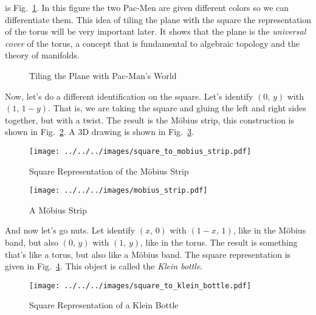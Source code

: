 \documentclass{article}
\theoremstyle{plain}
\theoremstyle{normal}
\begin{document}
        is Fig.~\ref{fig:plane_torus_pacman}. In this figure the two Pac-Men are
        given different colors so we can differentiate them. This idea of tiling
        the plane with the square the representation of the torus will be very
        important later. It shows that the plane is the
        \textit{universal cover} of the torus, a concept that is fundamental
        to algebraic topology and the theory of manifolds.
        \begin{figure}
            \centering
            \caption{Tiling the Plane with Pac-Man's World}
            \label{fig:plane_torus_pacman}
        \end{figure}
        \par\hfill\par
        Now, let's do a different identification on the square. Let's identify
        $(0,\,y)$ with $(1,\,1-y)$. That is, we are taking the square and
        gluing the left and right sides together, but with a twist. The
        result is the M\"{o}bius strip, this construction is shown in
        Fig.~\ref{fig:square_to_mobius_strip}. A 3D drawing is shown in
        Fig.~\ref{fig:mobius_strip}.
        \begin{figure}
            \centering
            \texttt{[image: ../../../images/square\_to\_mobius\_strip.pdf]}
            \caption{Square Representation of the M\"{o}bius Strip}
            \label{fig:square_to_mobius_strip}
        \end{figure}
        \begin{figure}
            \centering
            \texttt{[image: ../../../images/mobius\_strip.pdf]}
            \caption{A M\"{o}bius Strip}
            \label{fig:mobius_strip}
        \end{figure}
        \par\hfill\par
        And now let's go nuts. Let identify
        $(x,\,0)$ with $(1-x,\,1)$, like in the M\"{o}bius band, but also
        $(0,\,y)$ with $(1,\,y)$, like in the torus. The result is something
        that's like a torus, but also like a M\"{o}bius band. The square
        representation is given in Fig.~\ref{fig:square_to_klein_bottle}.
        This object is called the \textit{Klein bottle}.
        \begin{figure}
            \centering
            \texttt{[image: ../../../images/square\_to\_klein\_bottle.pdf]}
            \caption{Square Representation of a Klein Bottle}
            \label{fig:square_to_klein_bottle}
        \end{figure}
\end{document}
